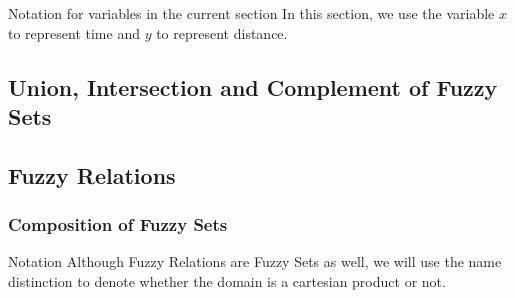 \begin{notation}[label={not:OpsFS}]{Notation for variables in the current section}
    In this section, we use the variable \( x \) to represent time and \( y \) to represent distance.
  \end{notation}

\subsection{Union, Intersection and Complement of Fuzzy Sets}
\begin{definition}
    
\end{definition}

\begin{definition}
    
\end{definition}


\begin{definition}[Complement]
    
\end{definition}

\subsection{Fuzzy Relations}
\begin{definition*}
    
\end{definition*}

\begin{definition}
    
\end{definition}


\begin{definition*}

\end{definition*}

\begin{definition}

\end{definition}

\begin{definition}

\end{definition}

\subsubsection*{Composition of Fuzzy Sets}
\begin{notation}[label={not:compositionFS}]{Notation}
    Although Fuzzy Relations are Fuzzy Sets as well, we will use the name distinction to denote whether the domain is a cartesian product or not.
  \end{notation}
\begin{definition}
    
\end{definition}

\begin{definition}
    
\end{definition}